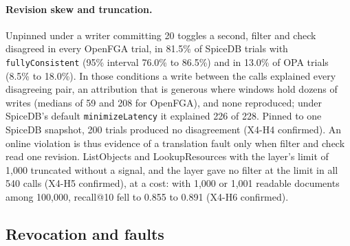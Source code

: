 \paragraph{Revision skew and truncation.}
Unpinned under a writer committing 20 toggles a second, filter and check disagreed in every OpenFGA trial,
in 81.5\% of SpiceDB trials with \texttt{fullyConsistent} (95\% interval 76.0\% to 86.5\%) and in 13.0\% of
OPA trials (8.5\% to 18.0\%). In those conditions a write between the calls explained every disagreeing pair, an attribution that is
generous where windows hold dozens of writes (medians of 59 and 208 for OpenFGA), and none reproduced; under SpiceDB's default
\texttt{minimizeLatency} it explained 226 of 228. Pinned to one SpiceDB snapshot, 200 trials produced no disagreement (X4-H4 confirmed). An online
violation is thus evidence of a translation fault only when filter and check read one revision. ListObjects and
LookupResources with the layer's limit of 1,000 truncated without a signal, and the layer gave no filter at the limit in all 540 calls (X4-H5
confirmed), at a cost: with 1,000 or 1,001 readable documents among 100,000, recall@10 fell to 0.855
to 0.891 (X4-H6 confirmed).

\subsection{Revocation and faults}\label{sec:eng-revoke}

